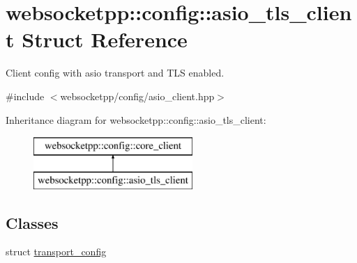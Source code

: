 \hypertarget{structwebsocketpp_1_1config_1_1asio__tls__client}{}\section{websocketpp\+:\+:config\+:\+:asio\+\_\+tls\+\_\+client Struct Reference}
\label{structwebsocketpp_1_1config_1_1asio__tls__client}


Client config with asio transport and T\+L\+S enabled.  




{\ttfamily \#include $<$websocketpp/config/asio\+\_\+client.\+hpp$>$}

Inheritance diagram for websocketpp\+:\+:config\+:\+:asio\+\_\+tls\+\_\+client\+:\begin{figure}[H]
\begin{center}
\leavevmode
\includegraphics[height=2.000000cm]{structwebsocketpp_1_1config_1_1asio__tls__client}
\end{center}
\end{figure}
\subsection*{Classes}
\begin{DoxyCompactItemize}
\item 
struct \hyperlink{structwebsocketpp_1_1config_1_1asio__tls__client_1_1transport__config}{transport\+\_\+config}
\end{DoxyCompactItemize}
